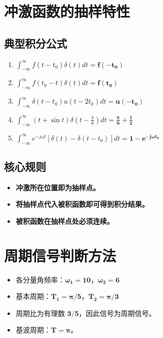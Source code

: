 \section{冲激函数的抽样特性}
\subsection{典型积分公式}
\begin{enumerate}
    \item $\displaystyle \int_{-\infty}^{\infty} f(t-t_0)\delta(t)dt = \boldsymbol{f(-t_0)}$
    \item $\displaystyle \int_{-\infty}^{\infty} f(t_0-t)\delta(t)dt = \boldsymbol{f(t_0)}$
    \item $\displaystyle \int_{-\infty}^{\infty} \delta(t-t_0)u(t-2t_0)dt = \boldsymbol{u(-t_0)}$
    \item $\displaystyle \int_{-\infty}^{\infty} (t+\sin t)\delta\left(t-\frac{\pi}{6}\right)dt = \boldsymbol{\frac{\pi}{6}+\frac{1}{2}}$
    \item $\displaystyle \int_{-\infty}^{\infty} e^{-j\omega t}\left[\delta(t)-\delta(t-t_0)\right]dt = \boldsymbol{1 - e^{-j\omega t_0}}$
\end{enumerate}

\subsection{核心规则}
\begin{itemize}
    \item \textbf{冲激所在位置即为抽样点。}
    \item \textbf{将抽样点代入被积函数即可得到积分结果。}
    \item \textbf{被积函数在抽样点处必须连续。}
\end{itemize}

\section{周期信号判断方法}
\begin{itemize}
\item 各分量角频率：$\boldsymbol{\omega_1=10}$，$\boldsymbol{\omega_2=6}$
\item 基本周期：$\boldsymbol{T_1=\pi/5}$，$\boldsymbol{T_2=\pi/3}$
\item 周期比为有理数 $\boldsymbol{3/5}$，因此信号为周期信号。
\item 基波周期：$\boldsymbol{T=\pi}$。
\end{itemize}

